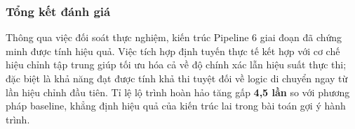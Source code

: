 \subsubsection{Tổng kết đánh giá}
Thông qua việc đối soát thực nghiệm, kiến trúc Pipeline 6 giai đoạn đã chứng minh được tính hiệu quả. Việc tích hợp định tuyến thực tế kết hợp với cơ chế hiệu chỉnh tập trung giúp tối ưu hóa cả về độ chính xác lẫn hiệu suất thực thi; đặc biệt là khả năng đạt được tính khả thi tuyệt đối về logic di chuyển ngay từ lần hiệu chỉnh đầu tiên. Tỉ lệ lộ trình hoàn hảo tăng gấp \textbf{4,5 lần} so với phương pháp baseline, khẳng định hiệu quả của kiến trúc lai trong bài toán gợi ý hành trình.